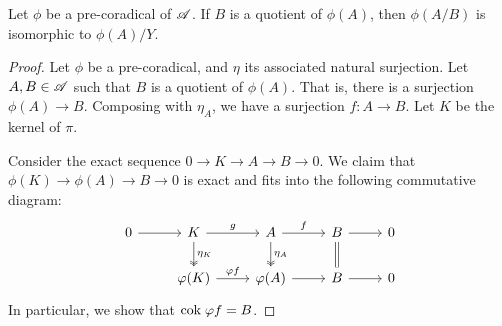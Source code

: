 \begin{prop}
Let $\phi$ be a pre-coradical of $\mathscr{A}$. If $B$ is a quotient 
of $\phi(A)$, then $\phi(A/B)$ is isomorphic to $\phi(A)/Y$. 
\end{prop}
\begin{proof}
Let $\phi$ be a pre-coradical, and $\eta$ its associated natural
surjection. Let $A, B \in \mathscr{A}$ such that $B$ is a quotient of
$\phi(A)$. That is, there is a surjection $\phi(A) \to B$. 
Composing with $\eta_A$, we have a surjection $f: A \to B$. Let 
$K$ be the kernel of $\pi$.

Consider the exact sequence $0 \to K \to A \to B \to 0$. We claim
that $\phi(K) \to \phi(A) \to B \to 0$ is exact and fits into the 
following commutative diagram:
\[
\begin{tikzcd}
0 \arrow{r} &
K \arrow{r}{g} \arrow[twoheadrightarrow]{d}{\eta_K} &
A \arrow{r}{f} \arrow[twoheadrightarrow]{d}{\eta_A} &
B \arrow{r} \arrow[equal]{d} &
0 \\
& \phi(K) \arrow{r}{\phi f} &
\phi(A) \arrow{r} &
B \arrow{r} &
0
\end{tikzcd}
\]
In particular, we show that $\mathrm{cok}\; \varphi f = B$.
\end{proof}
